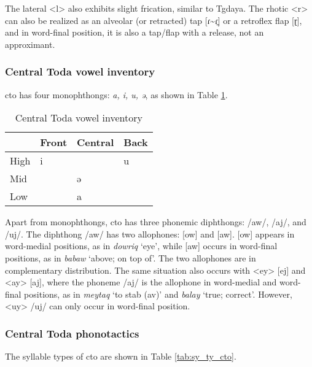 The lateral <l> also exhibits slight frication, similar to Tgdaya. The rhotic <r> can also be realized as an alveolar (or retracted) tap [ɾ\~{}ɾ̠] or a retroflex flap [ɽ], and in word-final position, it is also a tap/flap with a release, not an approximant.

\subsubsection{Central Toda vowel inventory}

\acl{cto} has four monophthongs: \textit{a, i, u, ə}, as shown in Table \ref{tab:ctoV}.

\begin{table}[!htbp]
\centering
\caption{Central Toda vowel inventory}
\label{tab:ctoV}
\begin{tabular}{llll}
\hline
     & Front & Central & Back \\ \hline
High &  i    &         &  u   \\
Mid  &       &  ə      &      \\
Low  &       &  a      &      \\ \hline
\end{tabular}
\end{table}

Apart from monophthongs, \acl{cto} has three phonemic diphthongs: /aw/, /aj/, and /uj/. The diphthong /aw/ has two allophones: [ow] and [aw]. [ow] appears in word-medial positions, as in \textit{dowriq} `eye', while [aw] occurs in word-final positions, as in \textit{babaw} `above; on top of'. The two allophones are in complementary distribution. The same situation also occurs with <ey> [ej] and <ay> [aj], where the phoneme /aj/ is the allophone in word-medial and word-final positions, as in \textit{meytaq} `to stab (\acs{av})' and \textit{balay} `true; correct'. However, <uy> /uj/ can only occur in word-final position.

\subsubsection{Central Toda phonotactics} \label{sec:cto_phonotactics}

The syllable types of \acl{cto} are shown in Table \ref{tab:sy_ty_cto}. 

